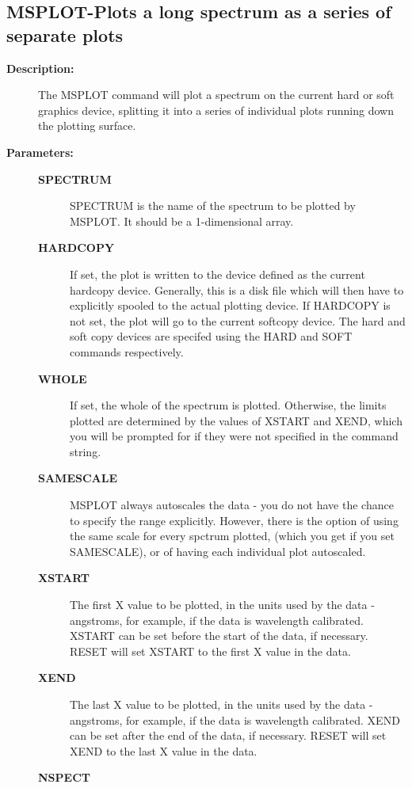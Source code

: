 \subsection{MSPLOT-\label{MSPLOT}Plots a long spectrum as a series of separate plots}
\begin{description}

\item [{\bf Description:}]
 The MSPLOT command will plot a spectrum on the current hard or soft
 graphics device, splitting it into a series of individual plots running
 down the plotting surface.

\item [{\bf Parameters:}]
\begin{description}
\item [{\bf SPECTRUM}]
 SPECTRUM is the name of the spectrum to be plotted by MSPLOT.
 It should be a 1-dimensional array.
\item [{\bf HARDCOPY}]
 If set, the plot is written to the device defined as the current
 hardcopy device.  Generally, this is a disk file which will then
 have to explicitly spooled to the actual plotting device.  If
 HARDCOPY is not set, the plot will go to the current softcopy
 device.  The hard and soft copy devices are specifed using the
 HARD and SOFT commands respectively.
\item [{\bf WHOLE}]
 If set, the whole of the spectrum is plotted.
 Otherwise, the limits plotted are determined by the values of XSTART
 and XEND, which you will be prompted for if they were not specified
 in the command string.
\item [{\bf SAMESCALE}]
 MSPLOT always autoscales the data - you do not have the chance to
 specify the range explicitly.  However, there is the option of using
 the same scale for every spctrum plotted, (which you get if you
 set SAMESCALE), or of having each individual plot autoscaled.
\item [{\bf XSTART}]
 The first X value to be plotted, in the units used
 by the data - angstroms, for example, if the data is wavelength
 calibrated.  XSTART can be set before the start of the data, if
 necessary.  RESET will set XSTART to the first X value in the data.
\item [{\bf XEND}]
 The last X value to be plotted, in the units used by
 the data - angstroms, for example, if the data is wavelength
 calibrated.  XEND can be set after the end of the data, if necessary.
 RESET will set XEND to the last X value in the data.
\item [{\bf NSPECT}]

\end{description}
\end{description}
